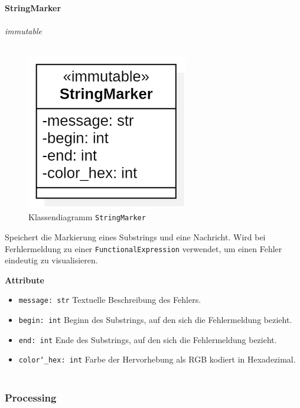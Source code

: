 \documentclass{article}
\begin{document}
\newpage
\textbf{\large{StringMarker}}\\\\
\textit{\flqq{}immutable\frqq}\normalsize\\\\
\begin{figure}[H]%
    \centering
    \includegraphics[width=7cm]{entwurf/Entwurf_dokument/img/cls/model/StringMarker.png}
    \caption{Klassendiagramm \texttt{StringMarker}}
\end{figure}

Speichert die Markierung eines Substrings und eine Nachricht. Wird bei Ferhlermeldung zu einer \texttt{FunctionalExpression} verwendet, um einen Fehler eindeutig zu visualisieren.
\newline \newline

\textbf{Attribute}
\begin{itemize}
\item \texttt{message: str} \newline Textuelle Beschreibung des Fehlers.
\item \texttt{begin: int} \newline Beginn des Substrings, auf den sich die Fehlermeldung bezieht.
\item \texttt{end: int} \newline Ende des Substrings, auf den sich die Fehlermeldung bezieht.
\item \texttt{color\char`_hex: int} \newline Farbe der Hervorhebung als RGB kodiert in Hexadezimal.
\\\\
\end{itemize}


\newpage
\subsubsection{Processing}
\end{document}
